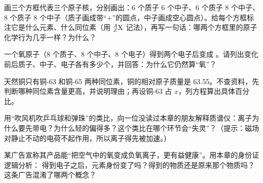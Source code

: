 \begin{sikaoti}
\item 画三个方框代表三个原子核，分别画出：6 个质子 6 个中子、6 个质子 8 个中子、8 个质子 8 个中子（质子画成带“$+$”的圆点，中子画成空心圆点）。给每个方框标注它是什么元素、什么同位素（用 ${}^{A}_{Z}\mathrm{X}$ 记法），再写一句话：哪两个方框里的原子化学行为几乎一样？为什么？
\item 一个氧原子（8 个质子、8 个中子、8 个电子）得到两个电子后变成 。请列出变化前后质子、中子、电子各有多少个，并回答：为什么它仍然算“氧”？
\item 天然铜只有铜-63 和铜-65 两种同位素，铜的相对原子质量是 63.55。不查资料，先判断哪种同位素含量更高，并说明理由；再设铜-63 占 $x$，列方程算出具体百分比。
\item 用“吹风机吹乒乓球和弹珠”的类比，向一位没读过本章的朋友解释质谱仪：离子为什么要先带电？为什么轻的偏得多？这个类比在哪个环节会“失灵”？（提示：磁场对静止不动的电荷不起作用，所以离子得先被加速。）
\item 某广告宣称其产品能“把空气中的氧变成负氧离子，更有益健康”。用本章的身份证逻辑分析： 得到电子之后，元素身份变了吗？得到的物质还是原来那个物质吗？这条广告混淆了哪两个概念？
\end{sikaoti}
